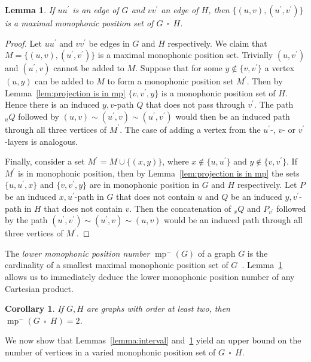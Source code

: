 \documentclass[12pt]{article}
\newtheorem{lemma}[theorem]{Lemma}
\newtheorem{corollary}[theorem]{Corollary}
\DeclareMathOperator {\mono} {mp}
\DeclareMathOperator{\cp}{\,\square\,}
\begin{document}
\begin{lemma}\label{lem:lowermp}
    If $uu^{\prime }$ is an edge of $G$ and $vv^{\prime }$ an edge of $H$, then $\{ (u,v),(u^{\prime },v^{\prime }) \} $ is a maximal monophonic position set of $G \cp H$.
\end{lemma}
\begin{proof}
    Let $uu^{\prime }$ and $vv^{\prime }$ be edges in $G$ and $H$ respectively. We claim that $M = \{ (u,v),(u^{\prime },v^{\prime })\} $ is a maximal monophonic position set. Trivially $(u,v^{\prime })$ and $(u^{\prime },v)$ cannot be added to $M$. Suppose that for some $y \notin \{ v,v^{\prime }\} $ a vertex $(u,y)$ can be added to $M$ to form a monophonic position set $M^{\prime }$. Then by Lemma~\ref{lem:projection is in mp} $\{ v,v^{\prime },y\} $ is a monophonic position set of $H$. Hence there is an induced $y,v$-path $Q$ that does not pass through $v^{\prime }$. The path $_uQ$ followed by $(u,v) \sim (u^{\prime },v) \sim (u^{\prime },v^{\prime })$ would then be an induced path through all three vertices of $M^{\prime } $. The case of adding a vertex from the $u^{\prime } $-, $v$- or $v^{\prime } $-layers is analogous. 

    Finally, consider a set $M^{\prime } = M \cup \{ (x,y) \} $, where $x \notin \{ u,u^{\prime } \} $ and $y \notin \{ v,v^{\prime } \} $. If $M^{\prime }$ is in monophonic position, then by Lemma~\ref{lem:projection is in mp} the sets $\{ u,u^{\prime },x\} $ and $\{ v,v^{\prime },y\} $ are in monophonic position in $G$ and $H$ respectively. Let $P$ be an induced $x,u^{\prime }$-path in $G$ that does not contain $u$ and $Q$ be an induced $y,v^{\prime }$-path in $H$ that does not contain $v$. Then the concatenation of $_xQ$ and $P_{v^{\prime }}$ followed by the path $(u^{\prime },v^{\prime }) \sim (u^{\prime },v) \sim (u,v)$ would be an induced path through all three vertices of $M^{\prime }$. 
\end{proof}

The {\em lower monophonic position number} $\mono ^-(G)$ of a graph $G$ is the cardinality of a smallest maximal monophonic position set of $G$~\cite{DiKlKrTu-2025}. Lemma~\ref{lem:lowermp} allows us to immediately deduce the lower monophonic position number of any Cartesian product.

\begin{corollary}
If $G,H$ are graphs with order at least two, then $\mono ^-(G \cp H) = 2$.
\end{corollary}

We now show that Lemmas~\ref{lemma:interval} and~\ref{lem:lowermp} yield an upper bound on the number of vertices in a varied monophonic position set of $G \cp H$.
\end{document}
